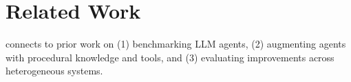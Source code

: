 \vspace{-4pt}
\section{Related Work}
\vspace{-4pt}
\label{sec:related-work}

\benchmarkName{} connects to prior work on (1) benchmarking LLM agents, (2) augmenting agents with procedural knowledge and tools, and (3) evaluating improvements across heterogeneous systems.





